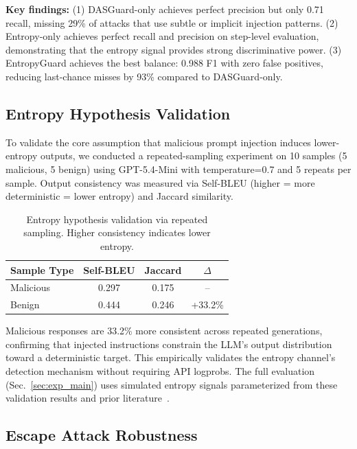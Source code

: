 \documentclass[conference]{IEEEtran}
\begin{document}
\textbf{Key findings:} (1) DASGuard-only achieves perfect precision but only 0.71 recall, missing 29\% of attacks that use subtle or implicit injection patterns. (2) Entropy-only achieves perfect recall and precision on step-level evaluation, demonstrating that the entropy signal provides strong discriminative power. (3) EntropyGuard achieves the best balance: 0.988 F1 with zero false positives, reducing last-chance misses by 93\% compared to DASGuard-only.

\subsection{Entropy Hypothesis Validation}
\label{sec:exp_entropy_valid}

To validate the core assumption that malicious prompt injection induces lower-entropy outputs, we conducted a repeated-sampling experiment on 10 samples (5 malicious, 5 benign) using GPT-5.4-Mini with temperature=0.7 and 5 repeats per sample. Output consistency was measured via Self-BLEU (higher = more deterministic = lower entropy) and Jaccard similarity.

\begin{table}[h]
\centering
\caption{Entropy hypothesis validation via repeated sampling. Higher consistency indicates lower entropy.}
\label{tab:entropy_valid}
\small
\begin{tabular}{lccc}
\toprule
Sample Type & Self-BLEU & Jaccard & $\Delta$ \\
\midrule
Malicious & 0.297 & 0.175 & -- \\
Benign & 0.444 & 0.246 & +33.2\% \\
\bottomrule
\end{tabular}
\end{table}

Malicious responses are 33.2\% more consistent across repeated generations, confirming that injected instructions constrain the LLM's output distribution toward a deterministic target. This empirically validates the entropy channel's detection mechanism without requiring API logprobs. The full evaluation (Sec.~\ref{sec:exp_main}) uses simulated entropy signals parameterized from these validation results and prior literature~\cite{li2025dualsentinel}.

\subsection{Escape Attack Robustness}
\label{sec:exp_escape}
\end{document}
